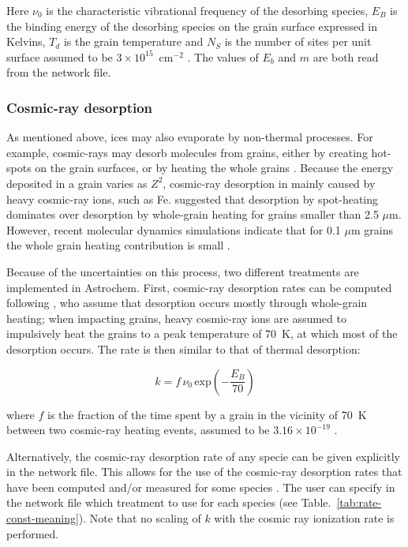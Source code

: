 \documentclass[a4paper,12pt]{article}
\begin{document}
\noindent
Here $\nu_{0}$ is the characteristic vibrational frequency of the
desorbing species, $E_{B}$ is the binding energy of the desorbing
species on the grain surface expressed in Kelvins, $T_{d}$ is the
grain temperature and $N_{S}$ is the number of sites per unit surface
assumed to be $3 \times 10^{15}$~cm$^{-2}$ \citep{Hasegawa92}. The
values of $E_{b}$ and $m$ are both read from the network file.

\subsubsection{Cosmic-ray desorption}
\label{sec:cosm-ray-desorpt}

As mentioned above, ices may also evaporate by non-thermal
processes. For example, cosmic-rays may desorb molecules from grains,
either by creating hot-spots on the grain surfaces, or by heating the
whole grains \citep{Leger85}. Because the energy deposited in a grain
varies as $Z^{2}$, cosmic-ray desorption in mainly caused by heavy
cosmic-ray ions, such as Fe. \cite{Leger85} suggested that desorption
by spot-heating dominates over desorption by whole-grain heating for
grains smaller than 2.5 $\mu$m. However, recent molecular dynamics
simulations indicate that for 0.1 $\mu$m grains the whole grain
heating contribution is small \citep{Bringa04}.

Because of the uncertainties on this process, two different treatments
are implemented in Astrochem. First, cosmic-ray desorption rates can
be computed following \citet{Hasegawa93}, who assume that desorption
occurs mostly through whole-grain heating; when impacting grains,
heavy cosmic-ray ions are assumed to impulsively heat the grains to a
peak temperature of 70~K, at which most of the desorption occurs. The
rate is then similar to that of thermal desorption:

\begin{equation}
  k = f \, \nu_{0} \, \mathrm{exp} \left( -\frac{E_{B}}{70} \right)
  \label{eq:cosmic-ray-desorption}
\end{equation}

\noindent
where $f$ is the fraction of the time spent by a grain in the vicinity
of 70~K between two cosmic-ray heating events, assumed to be $3.16
\times 10^{-19}$ \citep{Hasegawa93}.

Alternatively, the cosmic-ray desorption rate of any specie can be
given explicitly in the network file. This allows for the use of the
cosmic-ray desorption rates that have been computed and/or measured
for some species \citep[e.g. H$_{2}$O and CO;][]{Bringa04}. The user
can specify in the network file which treatment to use for each species
(see Table.~\ref{tab:rate-const-meaning}).  Note that no scaling of
$k$ with the cosmic ray ionization rate is performed.
\end{document}

